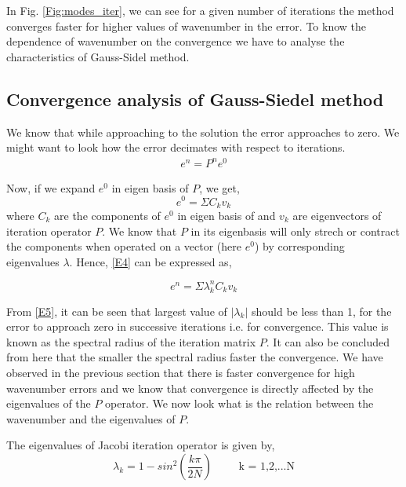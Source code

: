 In Fig. \ref{Fig:modes_iter}, we can see for a given number of iterations the method converges faster for higher values of wavenumber in the error. 
To know the dependence of wavenumber on the convergence we have to analyse the characteristics of Gauss-Sidel method.

\subsection{Convergence analysis of Gauss-Siedel method}

We know that while approaching to the solution the error approaches to zero. We might want to look how the error decimates with respect to iterations. 
\begin{equation}
 \begin{align}
 e^n = P^n e^0
 \end{align}
 \label{E4}
\end{equation}

Now, if we expand $e^0$ in eigen basis of $P$, we get,
\begin{equation}
 e^0 = \Sigma C_k v_k
\end{equation}
where $C_k$ are the components of $e^0$ in eigen basis of and $v_k$ are eigenvectors of iteration operator $P$. We know that $P$ in its eigenbasis 
will only strech or contract the components when operated on a vector (here $e^0$) by corresponding eigenvalues $\lambda$. Hence, \ref{E4} can be expressed as,

\begin{equation}
 e^n = \Sigma \lambda^n_k C_k v_k
 \label{E5}
\end{equation}

From \ref{E5}, it can be seen that largest value of $|\lambda_k|$ should be less than 1, for the error to approach zero in successive iterations i.e. for convergence. This value is 
known as the spectral radius of the iteration matrix $P$. It can also be concluded from here that the smaller the spectral radius faster the convergence. We have observed in the
previous section that there is faster convergence for high wavenumber errors and we know that convergence is directly affected by the eigenvalues of the $P$ operator. We now look
what is the relation between the wavenumber and the eigenvalues of $P$. \par

The eigenvalues of Jacobi iteration operator is given by,
\begin{equation}
 \lambda_k = 1- sin^2\left(\frac{k\pi}{2N}\right) \hspace{1cm}\text{k = 1,2,...N}
 \label{E6}
\end{equation}


